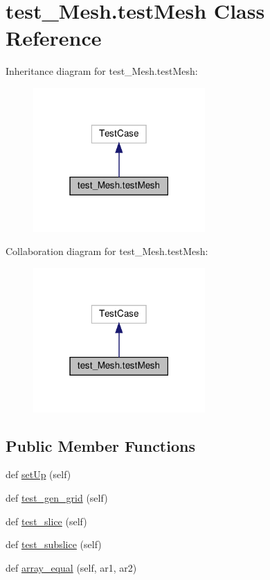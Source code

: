 \hypertarget{classtest__Mesh_1_1testMesh}{}\section{test\+\_\+\+Mesh.\+test\+Mesh Class Reference}
\label{classtest__Mesh_1_1testMesh}


Inheritance diagram for test\+\_\+\+Mesh.\+test\+Mesh\+:
\nopagebreak
\begin{figure}[H]
\begin{center}
\leavevmode
\includegraphics[width=186pt]{classtest__Mesh_1_1testMesh__inherit__graph}
\end{center}
\end{figure}


Collaboration diagram for test\+\_\+\+Mesh.\+test\+Mesh\+:
\nopagebreak
\begin{figure}[H]
\begin{center}
\leavevmode
\includegraphics[width=186pt]{classtest__Mesh_1_1testMesh__coll__graph}
\end{center}
\end{figure}
\subsection*{Public Member Functions}
\begin{DoxyCompactItemize}
\item 
def \hyperlink{classtest__Mesh_1_1testMesh_adfef7cb54161c643913e7ef04f5a6a8c}{set\+Up} (self)
\item 
def \hyperlink{classtest__Mesh_1_1testMesh_aadeb67b429e3e38bf9553a4ad2b251f0}{test\+\_\+gen\+\_\+grid} (self)
\item 
def \hyperlink{classtest__Mesh_1_1testMesh_a5d70383a4ae19751054929fac2c1e72d}{test\+\_\+slice} (self)
\item 
def \hyperlink{classtest__Mesh_1_1testMesh_a90c24624810adb09304515a6c41b3ad9}{test\+\_\+subslice} (self)
\item 
def \hyperlink{classtest__Mesh_1_1testMesh_af34f2fc5816343d4bfa4fffae6dc5f5d}{array\+\_\+equal} (self, ar1, ar2)
\end{DoxyCompactItemize}
